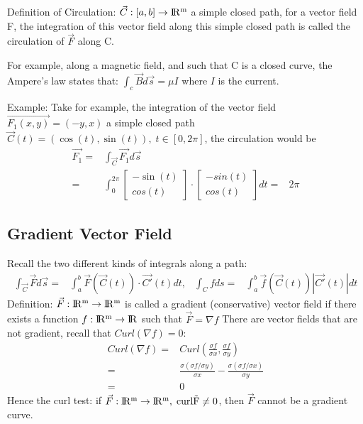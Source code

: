 \documentclass{article}
\newcommand{\VectorTwo}[2]{
    \left[
        \begin{array}{c}
            #1\\
            #2
        \end{array}
    \right]
}
\newcommand{\R}{\rm I\!R}
\begin{document}
        Definition of Circulation: $\vec{C}:[a,b]\rightarrow\R^m$ a simple closed path, for a vector field F, the integration of this vector field along this simple closed path is called the circulation of $\vec{F}$ along C.
        
        For example, along a magnetic field, and such that C is a closed curve, the Ampere's law states that: $\int_c\vec{B}d\vec{s} = \mu I$ where $I$ is the current.
        
        Example: Take for example, the integration of the vector field $\vec{F_1(x,y)}=(-y,x)$ a simple closed path $\vec{C}(t) = (\cos(t),\sin(t)),\;t\in[0,2\pi]$, the circulation would be
        \begin{align}
            \vec{F_1} =& \int_{\vec{C}}\vec{F_1}d\vec{s}\\
            =&\int_{0}^{2\pi}\VectorTwo{-\sin(t)}{cos(t)}\cdot\VectorTwo{-sin(t)}{cos(t)}dt
            =&2\pi
        \end{align}
    
    \subsection{Gradient Vector Field}
        Recall the two different kinds of integrals along a path:
        \begin{align*}
            \int_{\vec{C}}\vec{F}d\vec{s} =& \int_a^b \vec{F}(\vec{C}(t))\cdot\vec{C'}(t)dt, & \int_{C}fds =& \int_a^b \vec{f}(\vec{C}(t))|\vec{C'}(t)|dt
        \end{align*}
        Definition: $\vec{F}:\R^m\rightarrow\R^m$ is called a gradient (conservative) vector field if there exists a function $f:\R^m\rightarrow\R$ such that $\vec{F} = \nabla f$ There are vector fields that are not gradient, recall that $Curl(\nabla f) = 0$:
        \begin{align}
            Curl(\nabla f) =& Curl(\frac{\sigma f}{\sigma x},\frac{\sigma f}{\sigma y})\\
            =&\frac{\sigma{(\sigma f/\sigma y)}}{\sigma x}-\frac{\sigma{(\sigma f/\sigma x)}}{\sigma y}\\
            =&0
        \end{align}
        Hence the curl test: if $\vec{F}:\R^m\rightarrow\R^m,\;curl\vec{F}\neq0$, then $\vec{F}$ cannot be a gradient curve.
        
\end{document}
